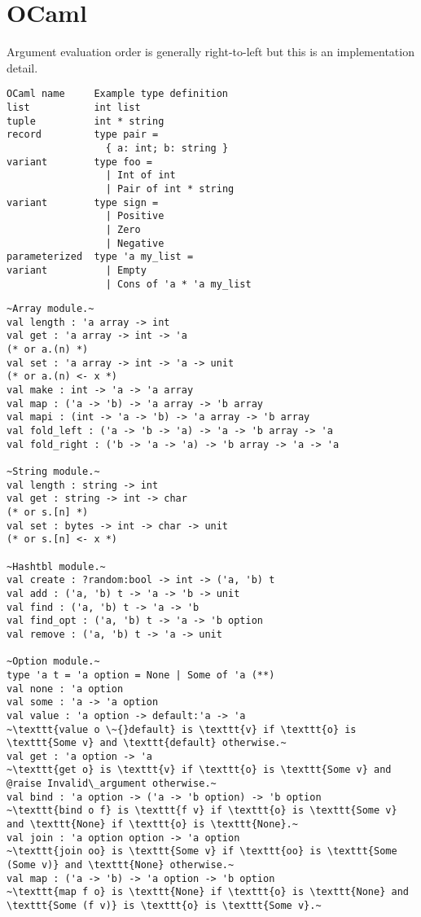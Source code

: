 \documentclass[fontsize=10pt]{slnotes}
\begin{document}
\clearpage\chapter{OCaml}%
Argument evaluation order is generally right-to-left but this is an implementation detail.

\begin{lstlisting}[escapechar=\~,escapebegin=\rmfamily,language={[Objective]Caml}]
OCaml name     Example type definition
list           int list
tuple          int * string
record         type pair =
                 { a: int; b: string }
variant        type foo =
                 | Int of int
                 | Pair of int * string
variant        type sign =
                 | Positive
                 | Zero
                 | Negative
parameterized  type 'a my_list =
variant          | Empty
                 | Cons of 'a * 'a my_list
\end{lstlisting}

\begin{lstlisting}[escapechar=\~,escapebegin=\rmfamily,language={[Objective]Caml}]
~Array module.~
val length : 'a array -> int
val get : 'a array -> int -> 'a
(* or a.(n) *)
val set : 'a array -> int -> 'a -> unit
(* or a.(n) <- x *)
val make : int -> 'a -> 'a array
val map : ('a -> 'b) -> 'a array -> 'b array
val mapi : (int -> 'a -> 'b) -> 'a array -> 'b array
val fold_left : ('a -> 'b -> 'a) -> 'a -> 'b array -> 'a
val fold_right : ('b -> 'a -> 'a) -> 'b array -> 'a -> 'a

~String module.~
val length : string -> int
val get : string -> int -> char
(* or s.[n] *)
val set : bytes -> int -> char -> unit
(* or s.[n] <- x *)

~Hashtbl module.~
val create : ?random:bool -> int -> ('a, 'b) t
val add : ('a, 'b) t -> 'a -> 'b -> unit
val find : ('a, 'b) t -> 'a -> 'b
val find_opt : ('a, 'b) t -> 'a -> 'b option
val remove : ('a, 'b) t -> 'a -> unit

~Option module.~
type 'a t = 'a option = None | Some of 'a (**)
val none : 'a option
val some : 'a -> 'a option
val value : 'a option -> default:'a -> 'a
~\texttt{value o \~{}default} is \texttt{v} if \texttt{o} is \texttt{Some v} and \texttt{default} otherwise.~
val get : 'a option -> 'a
~\texttt{get o} is \texttt{v} if \texttt{o} is \texttt{Some v} and @raise Invalid\_argument otherwise.~
val bind : 'a option -> ('a -> 'b option) -> 'b option
~\texttt{bind o f} is \texttt{f v} if \texttt{o} is \texttt{Some v} and \texttt{None} if \texttt{o} is \texttt{None}.~
val join : 'a option option -> 'a option
~\texttt{join oo} is \texttt{Some v} if \texttt{oo} is \texttt{Some (Some v)} and \texttt{None} otherwise.~
val map : ('a -> 'b) -> 'a option -> 'b option
~\texttt{map f o} is \texttt{None} if \texttt{o} is \texttt{None} and \texttt{Some (f v)} is \texttt{o} is \texttt{Some v}.~
\end{lstlisting}
\end{document}
